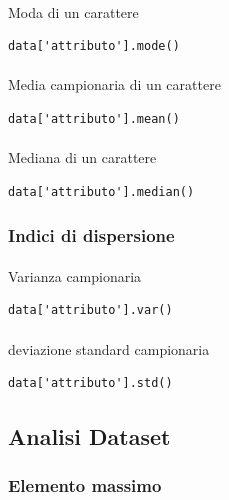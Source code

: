 \documentclass{article}
\begin{document}
\paragraph{}{Moda di un carattere}


\begin{lstlisting}
data['attributo'].mode()
\end{lstlisting}

\paragraph{}{Media campionaria di un carattere}

\begin{lstlisting}
data['attributo'].mean()
\end{lstlisting}

\paragraph{}{Mediana di un carattere}

\begin{lstlisting}
data['attributo'].median()
\end{lstlisting}

\subsubsection*{Indici di dispersione}

\paragraph{}{Varianza campionaria}

\begin{lstlisting}
data['attributo'].var()
\end{lstlisting}

\paragraph{}{deviazione standard campionaria}

\begin{lstlisting}
data['attributo'].std()
\end{lstlisting}

\subsection*{Analisi Dataset}

\subsubsection*{Elemento massimo}
\end{document}
